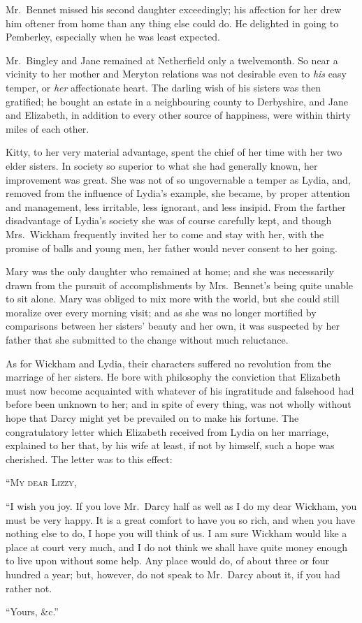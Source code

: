 Mr.\ Bennet missed his second daughter exceedingly;
his affection for her drew him oftener from home than
any thing else could do. He delighted in going to Pemberley,
especially when he was least expected.

Mr.\ Bingley and Jane remained at Netherfield only
a twelvemonth. So near a vicinity to her mother and
Meryton relations was not desirable even to \textit{his} easy
temper, or \textit{her} affectionate heart. The darling wish of
his sisters was then gratified; he bought an estate in a
neighbouring county to Derbyshire, and Jane and Elizabeth,
in addition to every other source of happiness, were
within thirty miles of each other.

Kitty, to her very material advantage, spent the chief
of her time with her two elder sisters. In society so
superior to what she had generally known, her improvement
was great. She was not of so ungovernable a temper
as Lydia, and, removed from the influence of Lydia’s
example, she became, by proper attention and management,
less irritable, less ignorant, and less insipid. From
the farther disadvantage of Lydia’s society she was of
course carefully kept, and though Mrs.\ Wickham
frequently invited her to come and stay with her, with the
promise of balls and young men, her father would never
consent to her going.

Mary was the only daughter who remained at home;
and she was necessarily drawn from the pursuit of accomplishments
by Mrs.\ Bennet’s being quite unable to sit
alone. Mary was obliged to mix more with the world,
but she could still moralize over every morning visit;
and as she was no longer mortified by comparisons between
her sisters’ beauty and her own, it was suspected by her
father that she submitted to the change without much
reluctance.

As for Wickham and Lydia, their characters suffered
no revolution from the marriage of her sisters. He bore
with philosophy the conviction that Elizabeth must now
become acquainted with whatever of his ingratitude and
falsehood had before been unknown to her; and in spite
of every thing, was not wholly without hope that Darcy
might yet be prevailed on to make his fortune. The congratulatory
letter which Elizabeth received from Lydia on
her marriage, explained to her that, by his wife at least,
if not by himself, such a hope was cherished. The letter
was to this effect:

\begin{letter}
“\textsc{My dear Lizzy},

“I wish you joy. If you love Mr.\ Darcy half as well
as I do my dear Wickham, you must be very happy.
It is a great comfort to have you so rich, and when you
have nothing else to do, I hope you will think of us. I am
sure Wickham would like a place at court very much, and
I do not think we shall have quite money enough to live
upon without some help. Any place would do, of about
three or four hundred a year; but, however, do not
speak to Mr.\ Darcy about it, if you had rather not.

\raggedleft “Yours, \&c.”
\end{letter}

